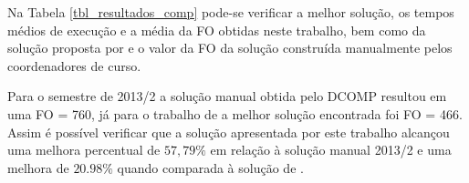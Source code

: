 \begin{table}[!htbp]
\caption{Melhores soluções, média das soluções e tempo para o Movimento Lecture Move com variação de alfa}
\label{tbl_resultados_tulio}
\end{table}

Na Tabela \ref{tbl_resultados_comp} pode-se verificar a melhor solução, os tempos médios de execução e a média da FO obtidas neste trabalho, bem como da solução proposta por  e o valor da FO da solução construída manualmente pelos coordenadores de curso.

Para o semestre de 2013/2 a solução manual obtida pelo DCOMP resultou em uma FO = 760, já para o trabalho de  a melhor solução encontrada foi FO = 466. Assim é possível verificar que a solução apresentada por este trabalho alcançou uma melhora percentual de \(57,79\%\) em relação à solução manual 2013/2 e uma melhora de \(20.98\%\) quando comparada à solução de .


